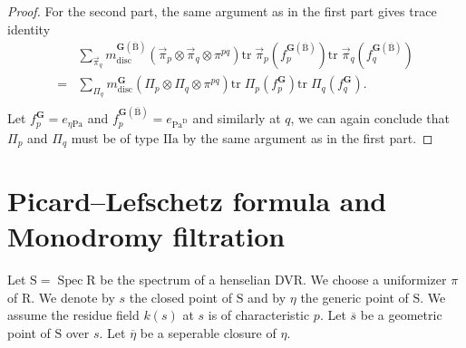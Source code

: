 \documentclass[10pt]{amsart}
\numberwithin{equation}{section}
\theoremstyle{definition}
\def\Pa{\mathrm{Pa}}
\DeclareMathOperator{\Spec}{Spec}
\def\bfG{\mathbf{G}}
\def\rma{\mathrm{a}}
\def\rmB{\mathrm{B}}
\def\rmD{\mathrm{D}}
\def\rmI{\mathrm{I}}
\def\rmR{\mathrm{R}}
\def\rmS{\mathrm{S}}
\begin{document}
\begin{proof}
For the second part, the same argument as in the first part gives trace identity
\begin{equation*}
\begin{aligned}
&\sum\limits_{\vec{\pi}_{q}} m^{\bfG(\overline{\rmB})}_{\mathrm{disc}}(\vec{\pi}_{p}\otimes\vec{\pi}_{q}\otimes\pi^{pq})\mathrm{tr}\phantom{.}\vec{\pi}_{p}(f^{\bfG(\overline{\rmB})}_{p})\mathrm{tr}\phantom{.}\vec{\pi}_{q}(f^{\bfG(\overline{\rmB})}_{q})\\
=&\sum\limits_{\Pi_{q}} m^{\bfG}_{\mathrm{disc}}(\Pi_{p}\otimes\Pi_{q}\otimes\pi^{pq})\mathrm{tr}\phantom{.}{\Pi}_{p}(f^{\bfG}_{p})\mathrm{tr}\phantom{.}{\Pi}_{q}(f^{\bfG}_{q}).\\
\end{aligned}
\end{equation*}
Let $f^{\bfG}_{p}=e_{\eta\Pa}$ and $f^{\bfG(\overline{\rmB})}_{p}=e_{\Pa^{\rmD}}$ and similarly at $q$, we can again conclude that $\Pi_{p}$ and $\Pi_{q}$ must be of type $\rmI\rmI\rma$ by the same argument as in the first part.
\end{proof}




\section{Picard--Lefschetz formula and Monodromy filtration}
Let $\rmS=\Spec\rmR$ be the spectrum of a henselian DVR. We choose a uniformizer $\pi$ of $\rmR$. We denote by $s$ the closed point of $\rmS$ and by $\eta$ the generic point of $\rmS$. We assume the residue field $k(s)$ at $s$ is of characteristic $p$. Let $\overline{s}$ be a geometric point of $\rmS$ over $s$.  Let $\overline{\eta}$ be a seperable closure of $\eta$. 
\end{document}
